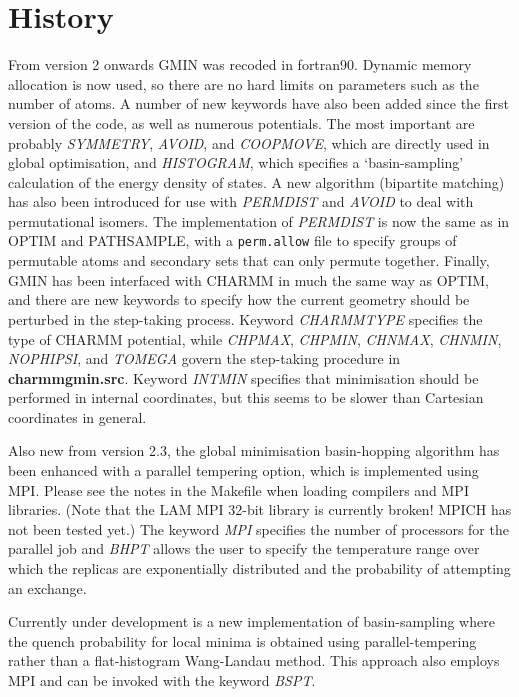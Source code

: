 \documentclass[12pt,a4paper,dvips]{article}
\begin{document}
\section{History}

From version 2 onwards GMIN was recoded in fortran90. 
Dynamic memory allocation is now used, so there are no hard limits on parameters
such as the number of atoms.
A number of new keywords have also been added since the first version of the code,
as well as numerous potentials.
The most important are probably {\it SYMMETRY}, {\it AVOID}, and {\it COOPMOVE}, which 
are directly used in global optimisation, 
and {\it HISTOGRAM}, which specifies a `basin-sampling' calculation of the energy
density of states.
A new algorithm (bipartite matching) has also been introduced for use with {\it PERMDIST}
and {\it AVOID} to deal with permutational isomers.
The implementation of {\it PERMDIST} is now the same as in OPTIM
and PATHSAMPLE, with a {\tt perm.allow} file to specify groups of permutable
atoms and secondary sets that can only permute together.
Finally, GMIN has been interfaced with CHARMM in much the same way as OPTIM, and there
are new keywords to specify how the current geometry should be perturbed in the
step-taking process. Keyword {\it CHARMMTYPE} specifies the type of CHARMM potential,
while {\it CHPMAX}, {\it CHPMIN}, {\it CHNMAX}, {\it CHNMIN},
{\it NOPHIPSI}, and {\it TOMEGA} govern the step-taking procedure in {\bf charmmgmin.src}.
Keyword {\it INTMIN} specifies that minimisation should be performed in internal coordinates,
but this seems to be slower than Cartesian coordinates in general.

Also new from version 2.3, the global minimisation basin-hopping algorithm has been enhanced with a 
parallel tempering option, which is implemented using MPI. Please see the notes
in the Makefile when loading compilers and MPI libraries. 
(Note that the LAM MPI 32-bit library is currently broken! MPICH has not been tested yet.)
The keyword {\it MPI} specifies
the number of processors for the parallel job and {\it BHPT} allows the user to specify the temperature
range over which the replicas are exponentially distributed and the probability of attempting 
an exchange.

Currently under development is a new implementation of basin-sampling where 
the quench probability for local minima is obtained using parallel-tempering rather than
a flat-histogram Wang-Landau method. This approach also employs MPI and can be invoked with 
the keyword {\it BSPT}.
\end{document}
